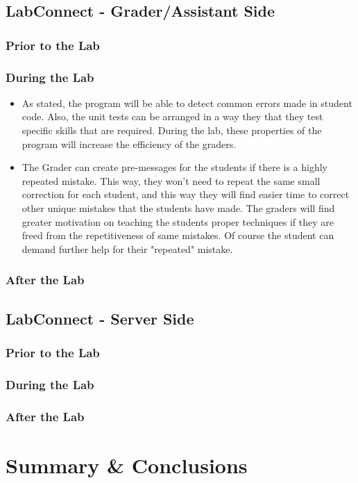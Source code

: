 \documentclass[a4paper, 12pt]{article}
\begin{document}
    
    \subsection{LabConnect - Grader/Assistant Side}
    
    \subsubsection{Prior to the Lab}
    
    
    \subsubsection{During the Lab}
    
    \begin{itemize}
        \item As stated, the program will be able to detect common errors made in student code. 
        Also, the unit tests can be arranged in a way they that they test specific skills that are
        required. During the lab, these properties of the program will increase the efficiency of the
        graders.
        \item The Grader can create pre-messages for the students if there is a highly repeated
        mistake. This way, they won't need to repeat the same small correction for each student,
        and this way they will find easier time to correct other unique mistakes that the students
        have made. The graders will find greater motivation on teaching the students proper techniques
        if they are freed from the repetitiveness of same mistakes. Of course the student can demand
        further help for their "repeated" mistake.
    \end{itemize}
    
    \subsubsection{After the Lab}
    
    \subsection{LabConnect - Server Side}

    \subsubsection{Prior to the Lab}
    
    
    \subsubsection{During the Lab}
    
    
    \subsubsection{After the Lab}
    
    
    \section{Summary \& Conclusions}
    
    
    \printbibliography
    
\end{document}
